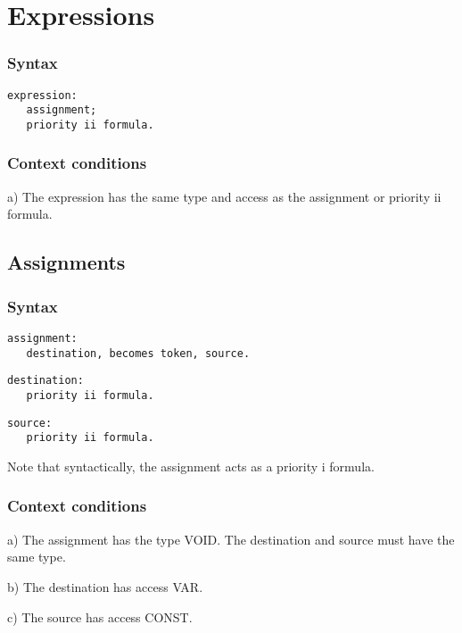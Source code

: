 \documentclass [a4paper,12pt,fleqn]{article}
\begin{document}
\section {Expressions}
\subsubsection*{Syntax}
\begin{letterlist}
\item
\begin{verbatim}
expression:
   assignment;
   priority ii formula.
\end{verbatim}
\end{letterlist}
\subsubsection*{Context conditions}
\begin{list}{-}{}
\item[a)]
The expression has the same type and access as the assignment or
priority ii formula.
\end{list}
\subsection{Assignments}
\subsubsection*{Syntax}
\begin{letterlist}
\item
\begin{verbatim}
assignment:
   destination, becomes token, source.
\end{verbatim}
\item
\begin{verbatim}
destination:
   priority ii formula.
\end{verbatim}
\item
\begin{verbatim}
source:
   priority ii formula.
\end{verbatim}
\end{letterlist}
Note that syntactically, the assignment acts as a priority i formula.
\subsubsection*{Context conditions}
\begin{list}{-}{}
\item[a)]
The assignment has the type VOID. The destination and source must
have the same type.
\item[b)]
The destination has access VAR.
\item[c)]
The source has access CONST.
\end{list}
\end{document}
